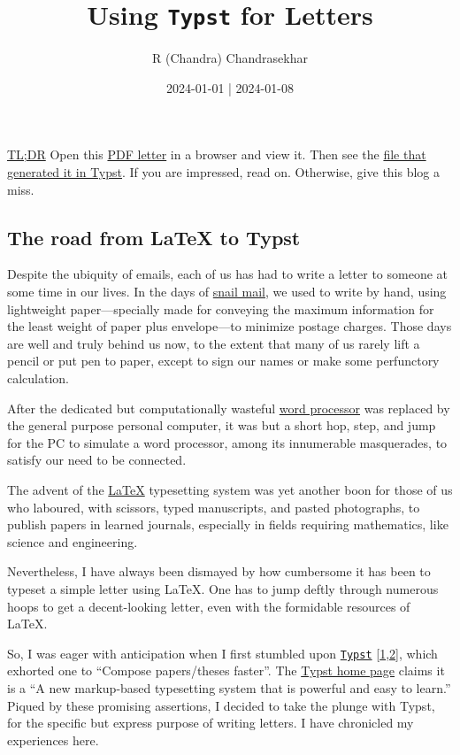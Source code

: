\documentclass[
  a4paper,
]{article}
\title{Using \texttt{Typst} for Letters}
\author{R (Chandra) Chandrasekhar}
\date{2024-01-01 | 2024-01-08}
\begin{document}
\maketitle

\thispagestyle{empty}


\href{https://dictionary.cambridge.org/dictionary/english/tldr}{TL;DR}
Open this \href{auxiliary/letter.pdf}{PDF letter} in a browser and view
it. Then see the \href{auxiliary/letter.typ}{file that generated it in
Typst}. If you are impressed, read on. Otherwise, give this blog a miss.

\hypertarget{the-road-from-latex-to-typst}{%
\subsection{The road from LaTeX to
Typst}\label{the-road-from-latex-to-typst}}

Despite the ubiquity of emails, each of us has had to write a letter to
someone at some time in our lives. In the days of
\href{https://www.merriam-webster.com/dictionary/snail\%20mail}{snail
mail}, we used to write by hand, using lightweight paper---specially
made for conveying the maximum information for the least weight of paper
plus envelope---to minimize postage charges. Those days are well and
truly behind us now, to the extent that many of us rarely lift a pencil
or put pen to paper, except to sign our names or make some perfunctory
calculation.

After the dedicated but computationally wasteful
\href{https://www.webopedia.com/definitions/word-processor/}{word
processor} was replaced by the general purpose personal computer, it was
but a short hop, step, and jump for the PC to simulate a word processor,
among its innumerable masquerades, to satisfy our need to be connected.

The advent of the \href{https://www.latex-project.org/}{LaTeX}
typesetting system was yet another boon for those of us who laboured,
with scissors, typed manuscripts, and pasted photographs, to publish
papers in learned journals, especially in fields requiring mathematics,
like science and engineering.

Nevertheless, I have always been dismayed by how cumbersome it has been
to typeset a simple letter using LaTeX. One has to jump deftly through
numerous hoops to get a decent-looking letter, even with the formidable
resources of LaTeX.

So, I was eager with anticipation when I first stumbled upon
\href{https://typst.app/}{\texttt{Typst}}
{[}\protect\hyperlink{ref-typst01}{1},\protect\hyperlink{ref-typst02}{2}{]},
which exhorted one to ``Compose papers/theses faster''. The
\href{https://github.com/typst/typst}{Typst home page} claims it is a
``A new markup-based typesetting system that is powerful and easy to
learn.'' Piqued by these promising assertions, I decided to take the
plunge with Typst, for the specific but express purpose of writing
letters. I have chronicled my experiences here.
\end{document}
